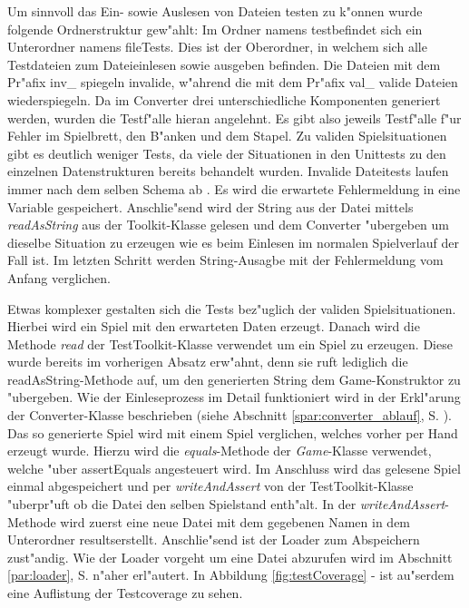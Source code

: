 Um sinnvoll das Ein- sowie Auslesen von Dateien testen zu k"onnen wurde folgende Ordnerstruktur gew"ahlt: Im Ordner namens \glqq test\grqq befindet sich ein Unterordner namens \glqq fileTests\grqq {}. Dies ist der Oberordner, in welchem sich alle Testdateien zum Dateieinlesen sowie ausgeben befinden. Die Dateien mit dem Pr"afix \glqq inv\_\grqq {} spiegeln invalide, w"ahrend die mit dem Pr"afix \glqq val\_\grqq {} valide Dateien wiederspiegeln. Da im Converter drei unterschiedliche Komponenten generiert werden, wurden die Testf"alle hieran angelehnt. Es gibt also jeweils Testf"alle f"ur Fehler im Spielbrett, den B"anken und dem Stapel. Zu validen Spielsituationen gibt es deutlich weniger Tests, da viele der Situationen in den Unittests zu den einzelnen Datenstrukturen bereits behandelt wurden. Invalide Dateitests laufen immer nach dem selben Schema ab . Es wird die erwartete Fehlermeldung in eine Variable gespeichert. Anschlie"send wird der String aus der Datei mittels \emph{readAsString} aus der Toolkit-Klasse gelesen und dem Converter "ubergeben um dieselbe Situation zu erzeugen wie es beim Einlesen im normalen Spielverlauf der Fall ist. Im letzten Schritt werden String-Ausagbe mit der Fehlermeldung vom Anfang verglichen. 

Etwas komplexer gestalten sich die Tests bez"uglich der validen Spielsituationen. Hierbei wird ein Spiel mit den erwarteten Daten erzeugt. Danach wird die Methode \emph{read} der TestToolkit-Klasse verwendet um ein Spiel zu erzeugen. Diese wurde bereits im vorherigen Absatz erw"ahnt, denn sie ruft lediglich die readAsString-Methode auf, um den generierten String dem Game-Konstruktor zu "ubergeben. Wie der Einleseprozess im Detail funktioniert wird in der Erkl"arung der Converter-Klasse beschrieben (siehe Abschnitt \ref{spar:converter_ablauf}, S. \pageref{spar:converter_ablauf}). Das so generierte Spiel wird mit einem Spiel verglichen, welches vorher \glqq per Hand\grqq {} erzeugt wurde. Hierzu wird die \emph{equals}-Methode der \emph{Game}-Klasse verwendet, welche "uber assertEquals angesteuert wird. Im Anschluss wird das gelesene Spiel einmal abgespeichert und per \emph{writeAndAssert} von der TestToolkit-Klasse "uberpr"uft ob die Datei den selben Spielstand enth"alt. In der \emph{writeAndAssert}-Methode wird zuerst eine neue Datei mit dem gegebenen Namen in dem Unterordner \glqq results\grqq  erstellt. Anschlie"send ist der Loader zum Abspeichern zust"andig. Wie der Loader vorgeht um eine Datei abzurufen wird im Abschnitt \ref{par:loader}, S. \pageref{par:loader} n"aher erl"autert. 
In Abbildung \ref{fig:testCoverage} -  ist au"serdem eine Auflistung der Testcoverage zu sehen.

